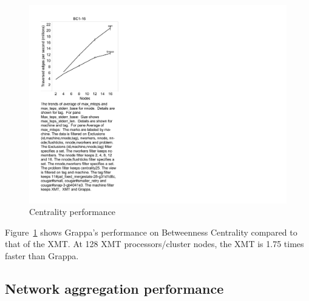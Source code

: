 \begin{figure}[tH]
\begin{center}
  \includegraphics[width=0.95\columnwidth]{figs/centrality_performance}
\begin{minipage}{0.95\columnwidth}
  \caption{\label{fig:centrality-performance} Centrality performance}
\end{minipage}
\vspace{-3ex}
\end{center}
\end{figure}

Figure~\ref{fig:centrality-performance} shows Grappa's performance on
Betweenness Centrality compared to that of the XMT. At 128 XMT
processors/cluster nodes, the XMT is 1.75 times faster than Grappa.

\subsection{Network aggregation performance}



